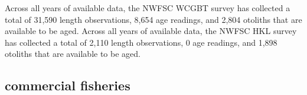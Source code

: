 \documentclass[11pt,
  english,
  letterpaper,
]{article}
\begin{document}
\leavevmode\tagmcend\tagstructend\par


Across all years of available data, the NWFSC WCGBT survey has collected a total of 31,590 length observations, 8,654 age readings, and 2,804 otoliths that are available to be aged. Across all years of available data, the NWFSC HKL survey has collected a total of 2,110 length observations, 0 age readings, and 1,898 otoliths that are available to be aged.

\leavevmode\tagmcend\tagstructend\par


\hypertarget{commercial-fisheries-12}{%
\subsection{commercial fisheries}\label{commercial-fisheries-12}}

\leavevmode\tagmcend\tagstructend


\begingroup\fontsize{10}{12}\selectfont \begingroup\fontsize{10}{12}\selectfont

\leavevmode\tagmcend\tagstructend\par
\end{document}
